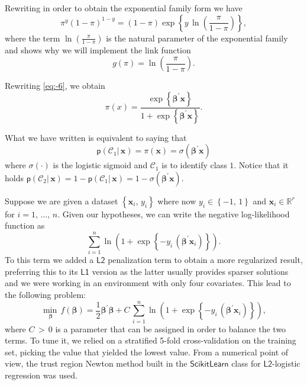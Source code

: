 \documentclass[a4paper]{article}
\begin{document}
Rewriting in order to obtain the exponential family form we have
\begin{equation}
\pi^{y}\left(1-\pi\right)^{1-y}=\left(1-\pi\right)\exp\left\{ y\,\ln\left(\frac{\pi}{1-\pi}\right)\right\} ,\label{eq:-2}
\end{equation}
where the term $\ln\left(\frac{\pi}{1-\pi}\right)$ is the natural
parameter of the exponential family and shows why we will implement
the link function
\begin{equation}
g\left(\pi\right)=\ln\left(\frac{\pi}{1-\pi}\right).\label{eq:-4}
\end{equation}

Rewriting \ref{eq:-6}, we obtain
\begin{equation}
\pi\left(x\right)=\frac{\exp\left\{ \mathbf{\beta}^{\prime}\mathbf{x}\right\} }{1+\exp\left\{ \mathbf{\beta}^{\prime}\mathbf{x}\right\} }.\label{eq:-5}
\end{equation}

What we have written is equivalent to saying that 
\begin{equation}
\mathsf{p}\left(\mathcal{C}_{1}|\,\mathbf{x}\right)=\pi\left(\mathbf{x}\right)=\sigma\left(\mathbf{\beta}^{\prime}\mathbf{x}\right)\label{eq:-7}
\end{equation}
where $\sigma\left(\cdot\right)$ is the logistic sigmoid and $\mathcal{C}_{1}$
is to identify class $1$. Notice that it holds $\mathsf{p}\left(\mathcal{C}_{2}|\,\mathbf{x}\right)=1-\mathsf{p}\left(\mathcal{C}_{1}|\,\mathbf{x}\right)=1-\sigma\left(\mathbf{\beta}^{\prime}\mathbf{x}\right)$.

Suppose we are given a dataset $\left\{ \mathbf{x}_{i},\,y_{i}\right\} $
where now $y_{i}\in\left\{ -1,\,1\right\} $ and $\mathbf{x}_{i}\in\mathbb{R}^{r}$
for $i=1,\,\ldots,\,n$. Given our hypotheses, we can write the negative
log-likelihood function as
\begin{equation}
\sum_{i=1}^{n}\ln\left(1+\exp\left\{ -y_{i}\,\left(\mathbf{\beta}^{\prime}\mathbf{x}_{i}\right)\right\} \right).\label{eq:-8}
\end{equation}
To this term we added a $\mathsf{L2}$ penalization term to obtain
a more regularized result, preferring this to its $\mathsf{L1}$ version
as the latter usually provides sparser solutions and we were working
in an environment with only four covariates. This lead to the following
problem:
\begin{equation}
\underset{\mathbf{\beta}}{\min\,}f\left(\mathbf{\beta}\right)=\frac{1}{2}\mathbf{\beta}^{\prime}\mathbf{\beta}+C\,\sum_{i=1}^{n}\ln\left(1+\exp\left\{ -y_{i}\,\left(\mathbf{\beta}^{\prime}\mathbf{x}_{i}\right)\right\} \right),\label{eq:-9}
\end{equation}
where $C\,>\,0$ is a parameter that can be assigned in order to balance
the two terms. To tune it, we relied on a stratified 5-fold cross-validation
on the training set, picking the value that yielded the lowest value.
From a numerical point of view, the trust region Newton method built
in the $\mathsf{ScikitLearn}$ class for $\mathsf{L2}$-logistic regression
was used.
\end{document}
